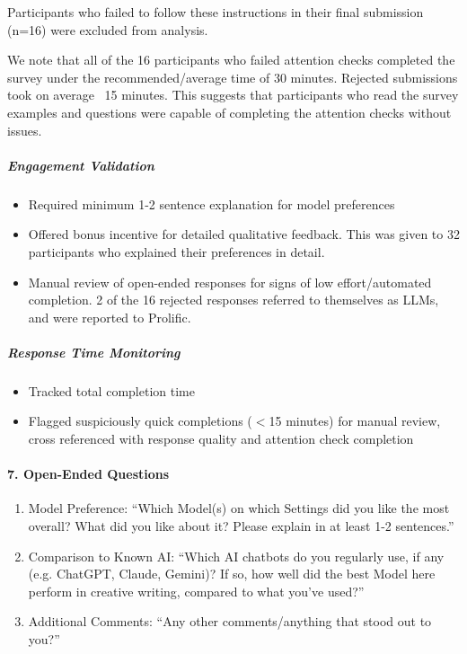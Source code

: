 \documentclass{article}
\begin{document}
Participants who failed to follow these instructions in their final submission (n=16) were excluded from analysis.

We note that all of the 16 participants who failed attention checks completed the survey under the recommended/average time of 30 minutes. Rejected submissions took on average ~15 minutes. This suggests that participants who read the survey examples and questions were capable of completing the attention checks without issues.

\subparagraph{Engagement Validation}
\begin{itemize}
    \item Required minimum 1-2 sentence explanation for model preferences
    \item Offered bonus incentive for detailed qualitative feedback. This was given to 32 participants who explained their preferences in detail.
    \item Manual review of open-ended responses for signs of low effort/automated completion. 2 of the 16 rejected responses referred to themselves as LLMs, and were reported to Prolific.
\end{itemize}

\subparagraph{Response Time Monitoring}
\begin{itemize}
    \item Tracked total completion time
    \item Flagged suspiciously quick completions ($<$15 minutes) for manual review, cross referenced with response quality and attention check completion
\end{itemize}

\paragraph{7. Open-Ended Questions}
\begin{enumerate}
    \item Model Preference: ``Which Model(s) on which Settings did you like the most overall? What did you like about it? Please explain in at least 1-2 sentences.''
    \item Comparison to Known AI: ``Which AI chatbots do you regularly use, if any (e.g. ChatGPT, Claude, Gemini)? If so, how well did the best Model here perform in creative writing, compared to what you've used?''
    \item Additional Comments: ``Any other comments/anything that stood out to you?''
\end{enumerate}
\end{document}
